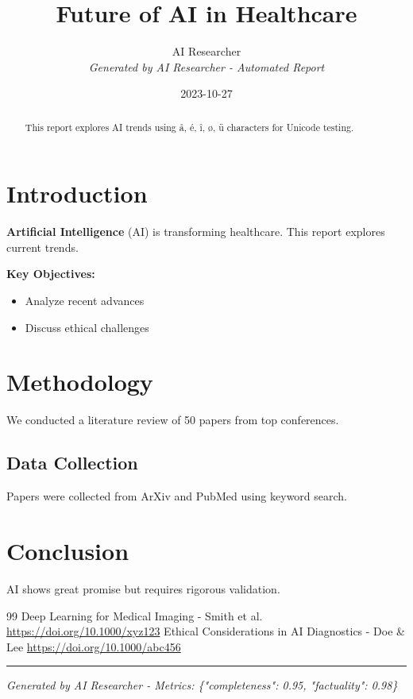 \documentclass{article}
\title{\textbf{Future of AI in Healthcare}}
\author{AI Researcher \\ \small \textit{Generated by AI Researcher - Automated Report}}
\date{2023-10-27}
\begin{document}
\maketitle
\tableofcontents
\newpage
\begin{abstract}
This report explores AI trends using å, é, î, ø, ü characters for Unicode testing.
\end{abstract}
\newpage
\section{Introduction}
\textbf{Artificial Intelligence} (AI) is transforming healthcare. This report explores current trends.

\textbf{Key Objectives:}
\begin{itemize}
\item Analyze recent advances
\item Discuss ethical challenges
\end{itemize}
\newpage
\section{Methodology}
We conducted a literature review of 50 papers from top conferences.
\subsection{Data Collection}
Papers were collected from ArXiv and PubMed using keyword search.
\newpage
\section{Conclusion}
AI shows great promise but requires rigorous validation.
\begin{thebibliography}{99}
 Deep Learning for Medical Imaging - Smith et al. \url{https://doi.org/10.1000/xyz123}
 Ethical Considerations in AI Diagnostics - Doe \& Lee \url{https://doi.org/10.1000/abc456}
\end{thebibliography}
\vspace{1cm}
\hrule
\small \textit{Generated by AI Researcher - Metrics: \{"completeness": 0.95, "factuality": 0.98\}}
\end{document}
